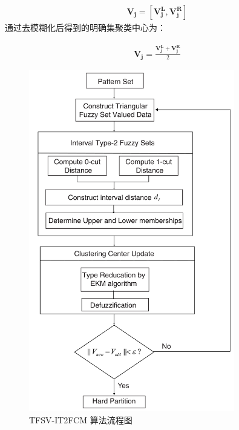 \begin{equation}\label{eq:17}
    \begin{split}
        \bm{V_j} = [\bm{V_j^L}, \bm{V_j^R}]
    \end{split}
\end{equation}
通过去模糊化后得到的明确集聚类中心为：

\begin{equation}\label{eq:18}
    \begin{split}
        \bm{V_j} = \frac{\bm{V_j^L}+\bm{V_j^R}}{2}
    \end{split}
\end{equation}

\begin{figure}[htb]
    \centering
    \includegraphics[width=0.8\textwidth]{figures/tfsvit2}
    \caption{TFSV-IT2FCM 算法流程图}\label{fig:tfsvit2}
  \end{figure}


